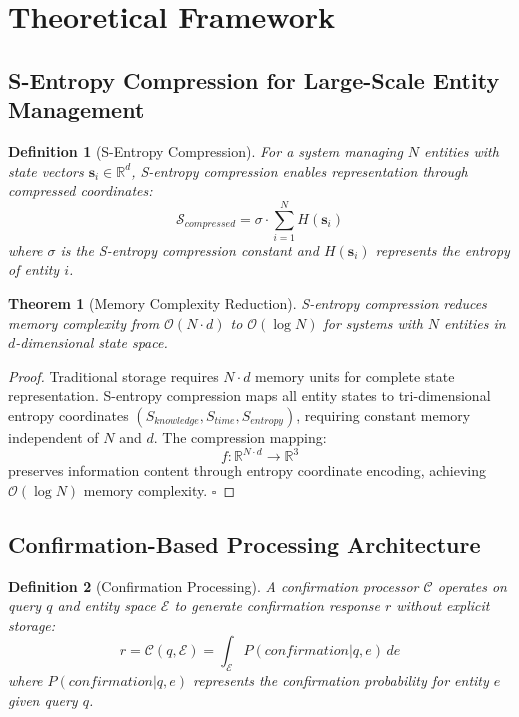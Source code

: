 \documentclass[12pt,a4paper]{article}
\newtheorem{theorem}{Theorem}
\newtheorem{definition}{Definition}
\begin{document}
\section{Theoretical Framework}

\subsection{S-Entropy Compression for Large-Scale Entity Management}

\begin{definition}[S-Entropy Compression]
For a system managing $N$ entities with state vectors $\mathbf{s}_i \in \mathbb{R}^d$, S-entropy compression enables representation through compressed coordinates:
\begin{equation}
\mathcal{S}_{compressed} = \sigma \cdot \sum_{i=1}^{N} H(\mathbf{s}_i)
\end{equation}
where $\sigma$ is the S-entropy compression constant and $H(\mathbf{s}_i)$ represents the entropy of entity $i$.
\end{definition}

\begin{theorem}[Memory Complexity Reduction]
S-entropy compression reduces memory complexity from $\mathcal{O}(N \cdot d)$ to $\mathcal{O}(\log N)$ for systems with $N$ entities in $d$-dimensional state space.
\end{theorem}

\begin{proof}
Traditional storage requires $N \cdot d$ memory units for complete state representation. S-entropy compression maps all entity states to tri-dimensional entropy coordinates $(S_{knowledge}, S_{time}, S_{entropy})$, requiring constant memory independent of $N$ and $d$. The compression mapping:
\begin{equation}
f: \mathbb{R}^{N \cdot d} \rightarrow \mathbb{R}^3
\end{equation}
preserves information content through entropy coordinate encoding, achieving $\mathcal{O}(\log N)$ memory complexity. $\square$
\end{proof}

\subsection{Confirmation-Based Processing Architecture}

\begin{definition}[Confirmation Processing]
A confirmation processor $\mathcal{C}$ operates on query $q$ and entity space $\mathcal{E}$ to generate confirmation response $r$ without explicit storage:
\begin{equation}
r = \mathcal{C}(q, \mathcal{E}) = \int_{\mathcal{E}} P(confirmation | q, e) \, de
\end{equation}
where $P(confirmation | q, e)$ represents the confirmation probability for entity $e$ given query $q$.
\end{definition}
\end{document}
